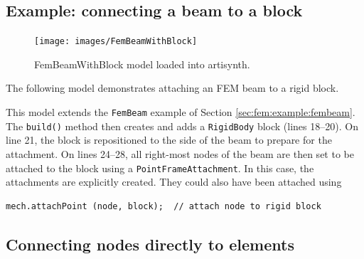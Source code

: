 \subsection{Example: connecting a beam to a block}

\begin{figure}[ht]
	\centering
	\texttt{[image: images/FemBeamWithBlock]}
	\caption{FemBeamWithBlock model loaded into artisynth.}
	\label{fig:fem:beamwithblock}
\end{figure}

The following model demonstrates attaching an FEM beam to a rigid block.
\lstset{numbers=left}

\lstset{numbers=none}
This model extends the {\tt FemBeam} example of Section 
\ref{sec:fem:example:fembeam}.  The {\tt build()} method then creates 
and adds a {\tt RigidBody} block (lines 18--20).  On line 21, the block
is repositioned to the side of the beam to prepare for the attachment.
On lines 24--28, all right-most nodes of the beam are then set to be attached
to the block using a {\tt PointFrameAttachment}.  In this case, the 
attachments are explicitly created.  They could also have been attached using
\begin{lstlisting}[]
   mech.attachPoint (node, block);  // attach node to rigid block
\end{lstlisting}

\subsection{Connecting nodes directly to elements}
\label{elementAttachment:sec}

